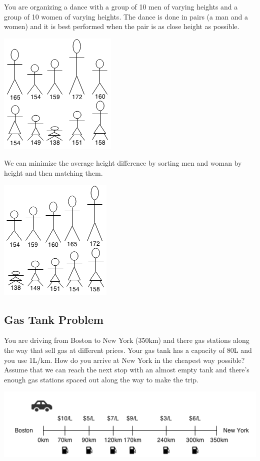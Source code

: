 \documentclass[11pt,oneside]{book}
\makeatletter
\def\maxwidth#1{\ifdim\Gin@nat@width>#1 #1\else\Gin@nat@width\fi}
\makeatother
\begin{document}
You are organizing a dance with a group of 10 men of varying heights and a group of 10 women of varying heights. The dance is done in pairs (a man and a women) and it is best performed when the pair is as close height as possible.

\vspace{5px}\includegraphics[width=\maxwidth{\textwidth}]{couplematch.png}

We can minimize the average height difference by sorting men and woman by height and then matching them.

\vspace{5px}\includegraphics[width=\maxwidth{\textwidth}]{couplematch2.png}

\subsection{Gas Tank Problem}

You are driving from Boston to New York (350km) and there gas stations along the way that sell gas at different prices. Your gas tank has a capacity of 80L and you use 1L/km. How do you arrive at New York in the cheapest way possible?
Assume that we can reach the next stop with an almost empty tank and there's enough gas stations spaced out along the way to make the trip.

\vspace{5px}\includegraphics[width=\maxwidth{\textwidth}]{gasproblem.png}
\end{document}
